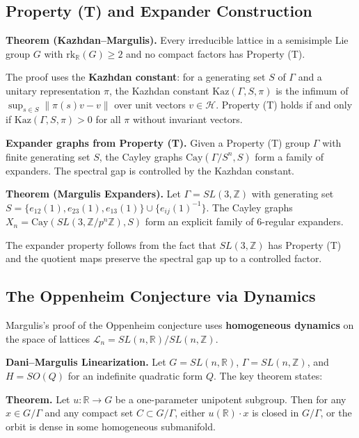 \subsection{Property (T) and Expander Construction}

\textbf{Theorem (Kazhdan--Margulis).} Every irreducible lattice in a
semisimple Lie group $G$ with $\mathrm{rk}_{\mathbb{R}}(G) \geq 2$
and no compact factors has Property (T).

The proof uses the \textbf{Kazhdan constant}: for a generating set
$S$ of $\Gamma$ and a unitary representation $\pi$, the Kazhdan
constant $\mathrm{Kaz}(\Gamma, S, \pi)$ is the infimum of
$\sup_{s \in S} \|\pi(s)v - v\|$ over unit vectors $v \in
\mathcal{H}$. Property (T) holds if and only if $\mathrm{Kaz}(\Gamma,
S, \pi) > 0$ for all $\pi$ without invariant vectors.

\textbf{Expander graphs from Property (T).} Given a Property (T) group
$\Gamma$ with finite generating set $S$, the Cayley graphs
$\mathrm{Cay}(\Gamma/S^n, S)$ form a family of expanders. The spectral
gap is controlled by the Kazhdan constant.

\textbf{Theorem (Margulis Expanders).} Let $\Gamma = SL(3,\mathbb{Z})$
with generating set $S = \{e_{12}(1), e_{23}(1), e_{13}(1)\} \cup
\{e_{ij}(1)^{-1}\}$. The Cayley graphs $X_n = \mathrm{Cay}(SL(3,\mathbb{Z}/p^n\mathbb{Z}), S)$ form an explicit family of 6-regular expanders.

The expander property follows from the fact that $SL(3,\mathbb{Z})$ has
Property (T) and the quotient maps preserve the spectral gap up to a
controlled factor.

\subsection{The Oppenheim Conjecture via Dynamics}

Margulis's proof of the Oppenheim conjecture uses \textbf{homogeneous
dynamics} on the space of lattices $\mathcal{L}_n =
SL(n,\mathbb{R})/SL(n,\mathbb{Z})$.

\textbf{Dani--Margulis Linearization.} Let $G = SL(n,\mathbb{R})$,
$\Gamma = SL(n,\mathbb{Z})$, and $H = SO(Q)$ for an indefinite
quadratic form $Q$. The key theorem states:

\textbf{Theorem.} Let $u: \mathbb{R} \to G$ be a one-parameter
unipotent subgroup. Then for any $x \in G/\Gamma$ and any compact
set $C \subset G/\Gamma$, either $u(\mathbb{R}) \cdot x$ is closed in
$G/\Gamma$, or the orbit is dense in some homogeneous submanifold.

